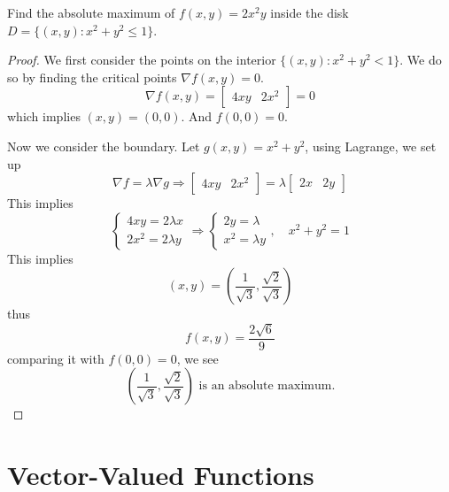 \documentclass[openany]{book}
\begin{document}
\begin{prob}
    Find the absolute maximum of $f(x,y)=2x^2y$ inside the disk $D=\{(x,y): x^2+y^2\leq 1\}$.
\end{prob}
\begin{proof}
    We first consider the points on the interior $\{(x,y): x^2+y^2<1\}$. We do so by finding the critical points $\nabla f(x,y)=0$.
    \begin{equation*}
        \nabla f(x,y)=\begin{bmatrix}4xy&2x^2\end{bmatrix}=0
    \end{equation*}
    which implies $(x,y)=(0,0)$. And $f(0,0)=0$.

    Now we consider the boundary. Let $g(x,y)=x^2+y^2$, using Lagrange, we set up 
    \begin{equation*}
        \nabla f=\lambda\nabla g\Rightarrow\begin{bmatrix}
            4xy&2x^2
        \end{bmatrix}=\lambda\begin{bmatrix}
            2x&2y
        \end{bmatrix}
    \end{equation*}
    This implies 
    \begin{equation*}
        \begin{cases}
            4xy=2\lambda x\\
            2x^2=2\lambda y
        \end{cases}\Rightarrow \begin{cases}
            2y=\lambda\\
            x^2=\lambda y
        \end{cases}, \quad x^2+y^2=1
    \end{equation*}
    This implies 
    \begin{equation*}
        (x,y)=\left(\frac{1}{\sqrt{3}}, \frac{\sqrt{2}}{\sqrt{3}}\right)
    \end{equation*}
    thus 
    \begin{equation*}
        f(x,y)=\frac{2\sqrt{6}}{9}
    \end{equation*}
    comparing it with $f(0,0)=0$, we see 
    \begin{equation*}
        \left(\frac{1}{\sqrt{3}}, \frac{\sqrt{2}}{\sqrt{3}}\right) \text{ is an absolute maximum.}
    \end{equation*}
\end{proof}


\chapter{Vector-Valued Functions}
\end{document}
